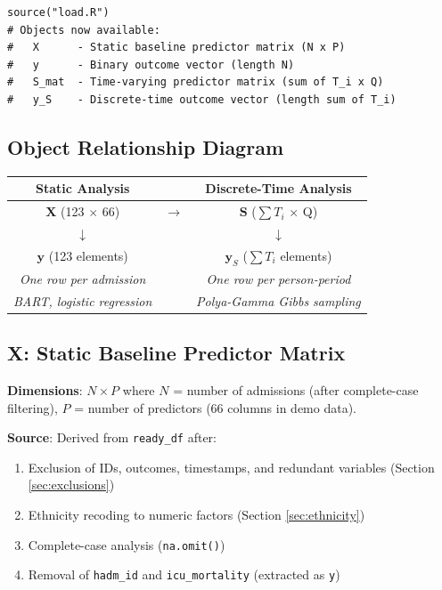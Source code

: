 \documentclass[11pt]{article}
\begin{document}
\begin{verbatim}
source("load.R")
# Objects now available:
#   X      - Static baseline predictor matrix (N x P)
#   y      - Binary outcome vector (length N)
#   S_mat  - Time-varying predictor matrix (sum of T_i x Q)
#   y_S    - Discrete-time outcome vector (length sum of T_i)
\end{verbatim}

\subsection{Object Relationship Diagram}

\begin{center}
\begin{tabular}{ccc}
\textbf{Static Analysis} & & \textbf{Discrete-Time Analysis} \\
\midrule
$\mathbf{X}$ (123 $\times$ 66) & $\longrightarrow$ & $\mathbf{S}$ ($\sum T_i$ $\times$ Q) \\
$\downarrow$ & & $\downarrow$ \\
$\mathbf{y}$ (123 elements) & & $\mathbf{y}_S$ ($\sum T_i$ elements) \\
\midrule
\textit{One row per admission} & & \textit{One row per person-period} \\
\textit{BART, logistic regression} & & \textit{Polya-Gamma Gibbs sampling} \\
\end{tabular}
\end{center}

\subsection{X: Static Baseline Predictor Matrix}

\textbf{Dimensions}: $N \times P$ where $N$ = number of admissions (after complete-case filtering), $P$ = number of predictors (66 columns in demo data).

\textbf{Source}: Derived from \texttt{ready\_df} after:
\begin{enumerate}[nosep]
    \item Exclusion of IDs, outcomes, timestamps, and redundant variables (Section \ref{sec:exclusions})
    \item Ethnicity recoding to numeric factors (Section \ref{sec:ethnicity})
    \item Complete-case analysis (\texttt{na.omit()})
    \item Removal of \texttt{hadm\_id} and \texttt{icu\_mortality} (extracted as \texttt{y})
\end{enumerate}
\end{document}
